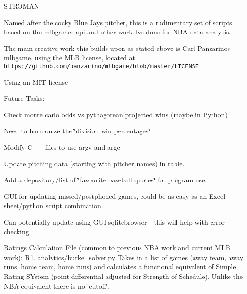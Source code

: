 S\+T\+R\+O\+M\+AN

Named after the cocky Blue Jays pitcher, this is a rudimentary set of scripts based on the mlbgames api and other work I\textquotesingle{}ve done for N\+BA data analysis.

The main creative work this builds upon as stated above is Carl Panzarino\textquotesingle{}s mlbgame, using the M\+LB license, located at \href{https://github.com/panzarino/mlbgame/blob/master/LICENSE}{\tt https\+://github.\+com/panzarino/mlbgame/blob/master/\+L\+I\+C\+E\+N\+SE}

Using an M\+IT license

Future Tasks\+:
\begin{DoxyItemize}
\item Check monte carlo odds vs pythagorean projected wins (maybe in Python)
\item Need to harmonize the \char`\"{}division win percentages\char`\"{}
\item Modify C++ files to use argv and argc
\item Update pitching data (starting with pitcher names) in table.
\item Add a depository/list of \char`\"{}favourite baseball quotes\char`\"{} for program use.
\item G\+UI for updating missed/postphoned games, could be as easy as an Excel sheet/python script combination.
\item Can potentially update using G\+UI sqlitebrowser -\/ this will help with error checking
\end{DoxyItemize}

Ratings Calculation File (common to previous N\+BA work and current M\+LB work)\+: R1. analytics/burke\+\_\+solver.\+py Takes in a list of games (away team, away runs, home team, home runs) and calculates a functional equivalent of Simple Rating S\+Ystem (point differential adjusted for Strength of Schedule). Unlike the N\+BA equivalent there is no \char`\"{}cutoff\char`\"{}.

